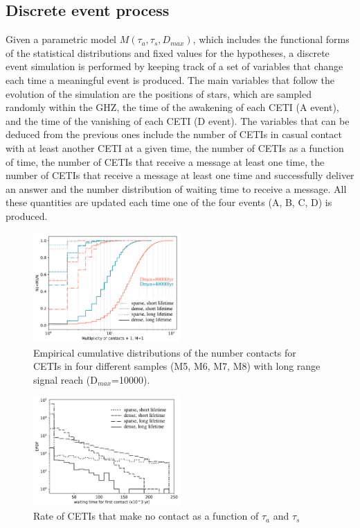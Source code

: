 \documentclass[crop]{CSLB}%
\begin{document}

\subsection{Discrete event process}

Given a parametric model $M(\tau_a, \tau_s, D_{max})$, which includes the
functional forms of the statistical distributions and fixed values for the
hypotheses, a discrete event simulation is performed by keeping track of a set
of variables that change each time a meaningful event is produced.
%
The main variables that follow the evolution of the simulation are the positions
of stars, which are sampled randomly within the GHZ, the time of the awakening
of each CETI (A event), and the time of the vanishing of each CETI (D event).
%
The variables that can be deduced from the previous ones include the number of
CETIs in casual contact with at least another CETI at a given time, the number
of CETIs as a function of time, the number of CETIs that receive a message at
least one time, the number of CETIs that receive a message at least one time and
successfully deliver an answer and the number distribution of waiting time to
receive a message.
%
All these quantities are updated each time one of the four events (A, B, C, D)
is produced.




                 
\begin{figure} \centering
   \includegraphics[width=0.5\textwidth]{F1.pdf}
   \caption{Empirical cumulative distributions of the number contacts
   for CETIs in four different samples (M5, M6, M7, M8) with long
   range signal reach (D$_{max}$=10000).
   }
\label{F_number_of_contacts} \end{figure}
   
\begin{figure} %
   \centering
   \includegraphics[width=0.5\textwidth]{F2.pdf}
   \caption{Rate of CETIs that make no contact as a function of
   $\tau_a$ and $\tau_s$}
   \label{F_waiting_time}
\end{figure}                       
 
\end{document}
